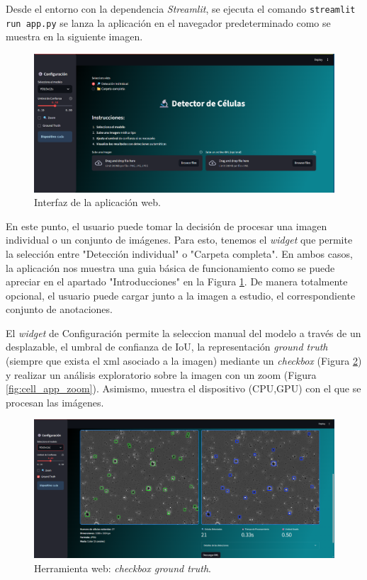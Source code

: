 \documentclass[12pt,a4paper,onecolumn,oneside]{report}
\begin{document}
Desde el entorno con la dependencia \textit{Streamlit}, se ejecuta el comando \texttt{streamlit run app.py}  se lanza la aplicación en el navegador predeterminado
como se muestra en la siguiente imagen.

\begin{figure}[htbp]
  \centering
  \includegraphics[width=1.0\textwidth]{figuras/app/cell_app.png}
  \caption{Interfaz de la aplicación web.}
  \label{fig:cell_app}
\end{figure}

En este punto, el usuario puede tomar la decisión de procesar una imagen individual o un conjunto de imágenes. Para esto, 
tenemos el \textit{widget} que permite la selección entre "Detección individual" o "Carpeta completa". En ambos casos,
la aplicación nos muestra una guia básica de funcionamiento como se puede apreciar en el apartado "Introducciones" en la Figura \ref{fig:cell_app}.
De manera totalmente opcional, el usuario puede cargar junto a la imagen a estudio, el correspondiente conjunto de anotaciones.

El \textit{widget} de Configuración permite la seleccion manual del modelo a través de un desplazable, el umbral de confianza de IoU, 
la representación \textit{ground truth} (siempre que exista el xml asociado a la imagen) mediante un \textit{checkbox} (Figura \ref{fig:cell_app_gt}) y realizar un análisis exploratorio
sobre la imagen con un zoom (Figura \ref{fig:cell_app_zoom}). Asimismo, muestra el dispositivo (CPU,GPU) con el que se procesan las imágenes.

\begin{figure}[htbp]
  \centering
  \includegraphics[width=1.0\textwidth]{figuras/app/prueba_imagen.png}
  \caption{Herramienta web: \textit{checkbox ground truth}.}
  \label{fig:cell_app_gt}
\end{figure}
\end{document}

